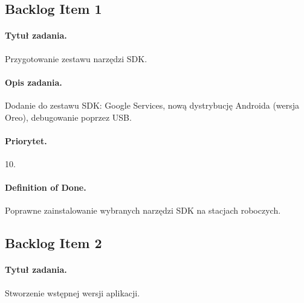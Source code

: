 \documentclass[a4paper]{article}
\begin{document}

\subsection{Backlog Item 1}
\paragraph{Tytuł zadania.} Przygotowanie zestawu narzędzi SDK.
\paragraph{Opis zadania.} Dodanie do zestawu SDK: Google Services, nową dystrybucję Androida (wersja Oreo), debugowanie poprzez USB.
\paragraph{Priorytet.} 10.
\paragraph{Definition of Done.} Poprawne zainstalowanie wybranych narzędzi SDK na stacjach roboczych.

\subsection{Backlog Item 2}
\paragraph{Tytuł zadania.} Stworzenie wstępnej wersji aplikacji.
\end{document}
